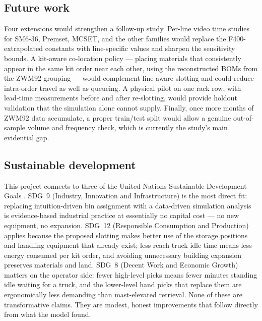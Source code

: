 \subsection*{Future work}

Four extensions would strengthen a follow-up study. Per-line video time
studies for SM6-36, Premset, MCSET, and the other families would replace
the F400-extrapolated constants with line-specific values and sharpen the
sensitivity bounds. A kit-aware co-location policy --- placing materials
that consistently appear in the same kit order near each other, using the
reconstructed BOMs from the ZWM92 grouping --- would complement
line-aware slotting and could reduce intra-order travel as well as
queueing. A physical pilot on one rack row, with lead-time measurements
before and after re-slotting, would provide holdout validation that the
simulation alone cannot supply. Finally, once more months of ZWM92 data
accumulate, a proper train/test split would allow a genuine out-of-sample
volume and frequency check, which is currently the study's main
evidential gap.

\subsection*{Sustainable development}

This project connects to three of the United Nations Sustainable
Development Goals \cite{sdgs}. SDG~9 (Industry, Innovation and
Infrastructure) is the most direct fit: replacing intuition-driven bin
assignment with a data-driven simulation analysis is evidence-based
industrial practice at essentially no capital cost --- no new equipment,
no expansion. SDG~12 (Responsible Consumption and Production) applies
because the proposed slotting makes better use of the storage positions
and handling equipment that already exist; less reach-truck idle time
means less energy consumed per kit order, and avoiding unnecessary
building expansion preserves materials and land. SDG~8 (Decent Work and
Economic Growth) matters on the operator side: fewer high-level picks
means fewer minutes standing idle waiting for a truck, and the
lower-level hand picks that replace them are ergonomically less demanding
than mast-elevated retrieval. None of these are transformative claims.
They are modest, honest improvements that follow directly from what the
model found.
